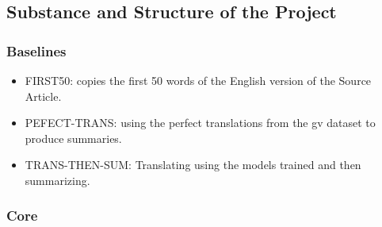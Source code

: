 \documentclass[12pt, a4paper]{article}
\begin{document}
\subsection*{Substance and Structure of the Project}

\subsubsection*{Baselines}
\begin{itemize}
  \item FIRST50: copies the first 50 words of the English version of the Source Article.
  \item PEFECT-TRANS: using the perfect translations from the gv dataset to produce summaries.
  \item TRANS-THEN-SUM: Translating using the models trained and then summarizing.
\end{itemize}

\subsubsection*{Core} 
\end{document}
